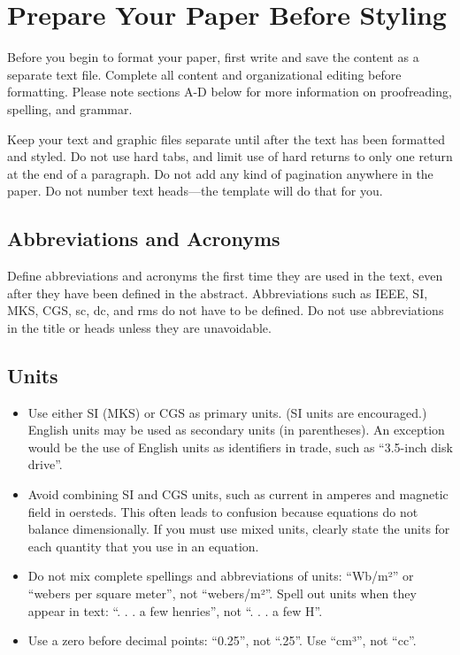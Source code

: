 \documentclass[a4paper,conference]{IEEEtran}
\begin{document}
\section{Prepare Your Paper Before Styling}
Before you begin to format your paper, first write and save the content as a separate text file. Complete all content and organizational editing before formatting. Please note sections A-D below for more information on proofreading, spelling, and grammar.

Keep your text and graphic files separate until after the text has been formatted and styled. Do not use hard tabs, and limit use of hard returns to only one return at the end of a paragraph. Do not add any kind of pagination anywhere in the paper. Do not number text heads—the template will do that for you.

\subsection{Abbreviations and Acronyms}
Define abbreviations and acronyms the first time they are used in the text, even after they have been defined in the abstract. Abbreviations such as IEEE, SI, MKS, CGS, sc, dc, and rms do not have to be defined. Do not use abbreviations in the title or heads unless they are unavoidable.

\subsection{Units}
\begin{itemize}
    \item Use either SI (MKS) or CGS as primary units. (SI units are encouraged.) English units may be used as secondary units (in parentheses). An exception would be the use of English units as identifiers in trade, such as “3.5-inch disk drive”.
    \item Avoid combining SI and CGS units, such as current in amperes and magnetic field in oersteds. This often leads to confusion because equations do not balance dimensionally. If you must use mixed units, clearly state the units for each quantity that you use in an equation.
    \item Do not mix complete spellings and abbreviations of units: “Wb/m²” or “webers per square meter”, not “webers/m²”. Spell out units when they appear in text: “. . . a few henries”, not “. . . a few H”.
    \item Use a zero before decimal points: “0.25”, not “.25”. Use “cm³”, not “cc”.
\end{itemize}
\end{document}
